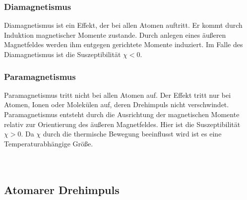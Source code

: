 \subsubsection*{Diamagnetismus}

Diamagnetismus ist ein Effekt, der bei allen Atomen auftritt. Er kommt durch Induktion magnetischer Momente zustande.
Durch anlegen eines äußeren Magnetfeldes werden ihm entgegen gerichtete Momente induziert.
Im Falle des Diamagnetismus ist die Suszeptibilität $χ < 0$. 

\subsubsection*{Paramagnetismus}

Paramagnetismus tritt nicht bei allen Atomen auf.
Der Effekt tritt nur bei Atomen, Ionen oder Molekülen auf, deren Drehimpuls nicht verschwindet.
Paramagnetismus entsteht durch die Ausrichtung der magnetischen Momente relativ zur Orientierung des äußeren Magnetfeldes.
Hier ist die Suszeptibilität $χ > 0$. 
Da $χ$ durch die thermische Bewegung beeinflusst wird ist es eine Temperaturabhängige Größe.
\\
\\
\\
\subsection{Atomarer Drehimpuls}

